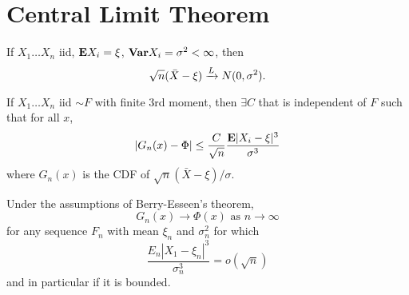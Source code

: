 \section{Central Limit Theorem}%
\label{sec:central_limit_theorem}

\begin{thm}
    If $X_1 \ldots X_n$ iid, $\mathbf{E} X_i = \xi$, $\mathbf{Var} X_i = \sigma^2 < \infty$, then
    \begin{equation*}
        \sqrt{n} (\bar{X} - \xi) \xrightarrow{L} N(0, \sigma^2).
    \end{equation*}
\end{thm}

\begin{thm}
    If $X_1 \ldots X_n$ iid $\sim F$ with finite 3rd moment, then $\exists C$
    that is independent of $F$ such that for all $x$,
    \begin{equation*}
        |G_n(x) - \Phi| \le \frac{C}{\sqrt{n}} \frac{\mathbf{E} |X_i - \xi|^3}{\sigma^3}
    \end{equation*}
    where $G_n(x)$ is the CDF of $\sqrt{n} (\bar{X} - \xi) / \sigma$.
\end{thm}

\begin{corollary}
    Under the assumptions of Berry-Esseen's theorem,
    \begin{equation*}
        G_n(x) \to \Phi(x) \text{ as } n \to \infty
    \end{equation*}
    for any sequence $F_n$ with mean $\xi_n$ and $\sigma_n^2$ for which
    \begin{equation*}
        \frac{E_n |X_1 - \xi_n|^3}{\sigma_n^3} = o(\sqrt{n})
    \end{equation*}
    and in particular if it is bounded.
\end{corollary}

